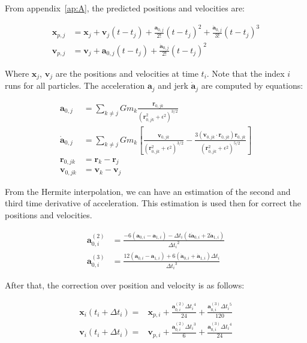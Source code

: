 From appendix~\ref{ap:A}, the predicted positions and velocities are:

\begin{align}
	\mathbf{x}_{p, j} &= \mathbf{x}_j + \mathbf{v}_j (t - t_j) + \frac{\mathbf{a}_{0,j}}{2!} (t - t_j)^2 + \frac{\dot{\mathbf{a}}_{0,j}}{3!} (t - t_j)^3 \\
	\mathbf{v}_{p, j} &= \mathbf{v}_j + \mathbf{a}_{0,j} (t - t_j) + \frac{\dot{\mathbf{a}}_{0,j}}{2!} (t - t_j)^2
\end{align}

Where $\mathbf{x}_j$, $\mathbf{v}_j$ are the positions and velocities at time $t_i$. Note that the index $i$ runs for all particles. The acceleration $\mathbf{a}_j$ and jerk $\dot{\mathbf{a}}_j$ are computed by equations:

 
\begin{align}
	\mathbf{a}_{0, j} &= \sum_{k \neq j} G m_k \frac{\mathbf{r}_{0,jk}}{(\mathbf{r}_{0,jk}^2 + \epsilon^2)^{3/2}}\\
	\dot{\mathbf{a}}_{0, j} &= \sum_{k \neq j} G m_k \left[\frac{\mathbf{v}_{0,jk}}{(\mathbf{r}_{0,jk}^2 + \epsilon^2)^{3/2}} - \frac{3(\mathbf{v}_{0,jk} \cdot \mathbf{r}_{0,jk})\mathbf{r}_{0,jk}}{(\mathbf{r}_{0,jk}^2 + \epsilon^2)^{5/2}}\right] \\
	\mathbf{r}_{0,jk} &= \mathbf{r}_{k} - \mathbf{r}_{j} \\
	\mathbf{v}_{0,jk} &= \mathbf{v}_{k} - \mathbf{v}_{j}
\end{align}

From the Hermite interpolation, we can have an estimation of the second and third time derivative of acceleration. This estimation is used then for correct the positions and velocities.

\begin{align}
	\mathbf{a}^{(2)}_{0, i} &= \frac{-6(\mathbf{a}_{0, i} - \mathbf{a}_{1, i}) - \Delta t_i(4\dot{\mathbf{a}}_{0, i} + 2\dot{\mathbf{a}}_{1, i})}{{\Delta t_i}^2} \\
	\mathbf{a}^{(3)}_{0, i} &= \frac{12 (\mathbf{a}_{0, i} - \mathbf{a}_{1, i}) + 6(\dot{\mathbf{a}}_{0, i} + \dot{\mathbf{a}}_{1, i})\Delta t_i}{{\Delta t_i}^3}
\end{align}

After that, the correction over position and velocity is as follows:

\begin{align}
	\mathbf{x}_i(t_i + \Delta t_i) =& \mathbf{x}_{p, i} + \frac{\mathbf{a}^{(2)}_{0, i} {\Delta t_i}^4}{24} + \frac{\mathbf{a}^{(3)}_{0, i} {\Delta t_i}^5}{120} \\
	\mathbf{v}_i(t_i + \Delta t_i) =& \mathbf{v}_{p, i} + \frac{\mathbf{a}^{(2)}_{0, i} {\Delta t_i}^3}{6} + \frac{\mathbf{a}^{(3)}_{0, i} {\Delta t_i}^4}{24}
\end{align}

